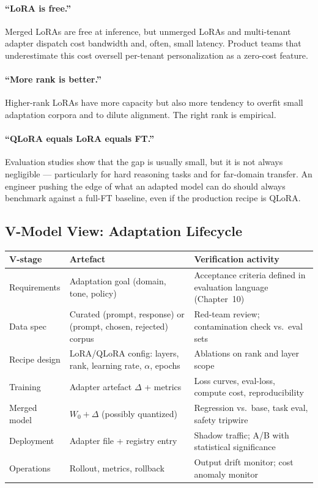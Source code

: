 \paragraph{``LoRA is free.''}
Merged LoRAs are free at inference, but unmerged LoRAs and
multi-tenant adapter dispatch cost bandwidth and, often, small
latency. Product teams that underestimate this cost oversell
per-tenant personalization as a zero-cost feature.

\paragraph{``More rank is better.''}
Higher-rank LoRAs have more capacity but also more tendency to
overfit small adaptation corpora and to dilute alignment. The right
rank is empirical.

\paragraph{``QLoRA equals LoRA equals FT.''}
Evaluation studies show that the gap is usually small, but it is
not always negligible --- particularly for hard reasoning tasks and
for far-domain transfer. An engineer pushing the edge of what an
adapted model can do should always benchmark against a full-FT
baseline, even if the production recipe is QLoRA.

\subsection{V-Model View: Adaptation Lifecycle}

\begin{center}
\small
\begin{tabular}{p{4.3cm}|p{4.3cm}|p{4.3cm}}
\textbf{V-stage} & \textbf{Artefact} & \textbf{Verification activity}\\\hline
Requirements & Adaptation goal (domain, tone, policy) & Acceptance criteria defined in evaluation language (Chapter~10) \\
Data spec & Curated (prompt, response) or (prompt, chosen, rejected) corpus & Red-team review; contamination check vs.\ eval sets \\
Recipe design & LoRA/QLoRA config: layers, rank, learning rate, $\alpha$, epochs & Ablations on rank and layer scope \\
Training & Adapter artefact $\Delta$ + metrics & Loss curves, eval-loss, compute cost, reproducibility \\
Merged model & $W_0 + \Delta$ (possibly quantized) & Regression vs.\ base, task eval, safety tripwire \\
Deployment & Adapter file + registry entry & Shadow traffic; A/B with statistical significance \\
Operations & Rollout, metrics, rollback & Output drift monitor; cost anomaly monitor \\
\end{tabular}
\end{center}

